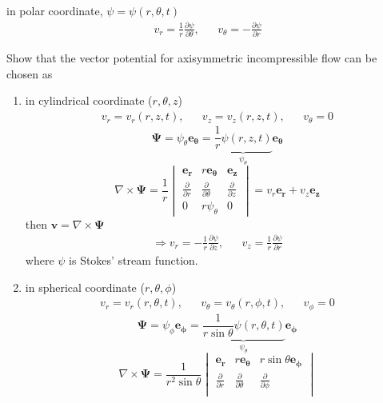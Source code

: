in polar coordinate, $\psi = \psi(r,\theta,t)$
\begin{align*}
v_r = \frac{1}{r}\frac{\partial\psi}{\partial\theta}, &&v_\theta = - \frac{\partial\psi}{\partial r}
\end{align*}
\begin{exercise}
Show that the vector potential for axisymmetric incompressible flow can be chosen as
\begin{enumerate}[label = \protect\circled{\arabic*}]
\item in cylindrical coordinate ($r,\theta,z$)
\begin{align*}
v_r = v_r(r,z,t), && v_z = v_z(r,z,t), && v_\theta = 0
\end{align*}
\begin{equation}
\boldsymbol{\Psi} = \psi_\theta\mathbf{e_\theta} = \underbrace{\frac{1}{r}\psi(r,z,t)}_{\psi_\theta}\mathbf{e_\theta}
\end{equation}
\[
\nabla\times\boldsymbol{\Psi} = \frac{1}{r}
\begin{vmatrix}
\mathbf{e_r} & r\mathbf{e_\theta} & \mathbf{e_z} \\
\displaystyle\frac{\partial}{\partial r} & \displaystyle\frac{\partial}{\partial\theta} & \displaystyle\frac{\partial}{\partial z} \\
0 & r\psi_\theta & 0
\end{vmatrix}
= v_r\mathbf{e_r} + v_z\mathbf{e_z}
\]
then $\mathbf{v} = \nabla\times\boldsymbol{\Psi}$ 
\begin{align*}
\Longrightarrow
v_r = -\frac{1}{r}\frac{\partial\psi}{\partial z}, && v_z = \frac{1}{r}\frac{\partial\psi}{\partial r}
\end{align*}
where $\psi$ is Stokes' stream function.
\item in spherical coordinate ($r,\theta,\phi$)
\begin{align*}
v_r = v_r(r,\theta,t), && v_\theta = v_\theta(r,\phi,t), && v_\phi = 0
\end{align*}
\begin{equation}
\boldsymbol{\Psi} = \psi_\phi\mathbf{e_\phi} = \underbrace{\frac{1}{r\sin\theta}\psi(r,\theta,t)}_{\psi_\theta}\mathbf{e_\phi}
\end{equation}
\[
\nabla\times\boldsymbol{\Psi} = \frac{1}{r^2\sin\theta}
\begin{vmatrix}
\mathbf{e_r} & r\mathbf{e_\theta} & r\sin\theta\mathbf{e_\phi} \\
\displaystyle\frac{\partial}{\partial r} & \displaystyle\frac{\partial}{\partial\theta} & \displaystyle\frac{\partial}{\partial \phi} \\

\end{vmatrix}\]
\end{enumerate}
\end{exercise}
